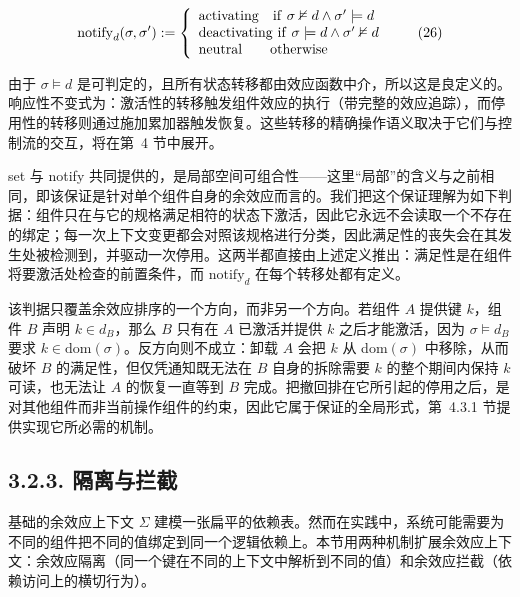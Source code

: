 \[
\mathrm { n o t i f y } _ { d } ( \sigma , \sigma ^ { \prime } ) : = \left\{ \begin{array} { l l } { \mathrm { a c t i v a t i n g } \quad \mathrm { i f } \ \sigma \nvDash d \land \sigma ^ { \prime } \models d } \\ { \mathrm { d e a c t i v a t i n g ~ i f } \ \sigma \models d \land \sigma ^ { \prime } \nvDash d } \\ { \mathrm { n e u t r a l } \quad \quad \mathrm { o t h e r w i s e } } \end{array} \right.\tag{26}
\]

由于 \(\sigma \models d\) 是可判定的，且所有状态转移都由效应函数中介，所以这是良定义的。响应性不变式为：激活性的转移触发组件效应的执行（带完整的效应追踪），而停用性的转移则通过施加累加器触发恢复。这些转移的精确操作语义取决于它们与控制流的交互，将在第~4 节中展开。

set 与 notify 共同提供的，是局部空间可组合性——这里“局部”的含义与之前相同，即该保证是针对单个组件自身的余效应而言的。我们把这个保证理解为如下判据：组件只在与它的规格满足相符的状态下激活，因此它永远不会读取一个不存在的绑定；每一次上下文变更都会对照该规格进行分类，因此满足性的丧失会在其发生处被检测到，并驱动一次停用。这两半都直接由上述定义推出：满足性是在组件将要激活处检查的前置条件，而 \(\mathrm { n o t i f y } _ { d }\) 在每个转移处都有定义。

该判据只覆盖余效应排序的一个方向，而非另一个方向。若组件 \(A\) 提供键 \(k\)，组件 \(B\) 声明 \(k \in d _ { B }\)，那么 \(B\) 只有在 \(A\) 已激活并提供 \(k\) 之后才能激活，因为 \(\sigma \models d _ { B }\) 要求 \(k \in \mathrm { d o m } ( \sigma )\)。反方向则不成立：卸载 \(A\) 会把 \(k\) 从 dom\(( \sigma )\) 中移除，从而破坏 \(B\) 的满足性，但仅凭通知既无法在 \(B\) 自身的拆除需要 \(k\) 的整个期间内保持 \(k\) 可读，也无法让 \(A\) 的恢复一直等到 \(B\) 完成。把撤回排在它所引起的停用之后，是对其他组件而非当前操作组件的约束，因此它属于保证的全局形式，第~4.3.1 节提供实现它所必需的机制。

\subsection{3.2.3. 隔离与拦截}\label{isolation-and-interception}

基础的余效应上下文 \(\Sigma\) 建模一张扁平的依赖表。然而在实践中，系统可能需要为不同的组件把不同的值绑定到同一个逻辑依赖上。本节用两种机制扩展余效应上下文：余效应隔离（同一个键在不同的上下文中解析到不同的值）和余效应拦截（依赖访问上的横切行为）。

